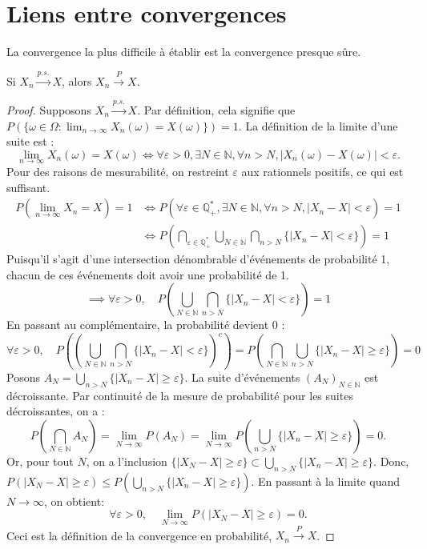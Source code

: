 \section{Liens entre convergences}
La convergence la plus difficile à établir est la convergence presque sûre.
\begin{proposition}
Si $X_n \xrightarrow{p.s.} X$, alors $X_n \xrightarrow{P} X$.
\end{proposition}
\begin{proof}
Supposons $X_n \xrightarrow{p.s.} X$. Par définition, cela signifie que $P(\{\omega \in \Omega : \lim_{n \to \infty} X_n(\omega) = X(\omega)\}) = 1$.
La définition de la limite d'une suite est :
\[
\lim_{n \to \infty} X_n(\omega) = X(\omega) \iff \forall \varepsilon > 0, \exists N \in \mathbb{N}, \forall n > N, |X_n(\omega) - X(\omega)| < \varepsilon.
\]
Pour des raisons de mesurabilité, on restreint $\varepsilon$ aux rationnels positifs, ce qui est suffisant.
\begin{align*}
    P(\lim_{n \to \infty} X_n = X) = 1 &\iff P\left(\forall \varepsilon \in \mathbb{Q}_+^*, \exists N \in \mathbb{N}, \forall n > N, |X_n - X| < \varepsilon\right) = 1 \\
    &\iff P\left(\bigcap_{\varepsilon \in \mathbb{Q}_+^*} \bigcup_{N \in \mathbb{N}} \bigcap_{n > N} \{|X_n - X| < \varepsilon\}\right) = 1
\end{align*}
Puisqu'il s'agit d'une intersection dénombrable d'événements de probabilité 1, chacun de ces événements doit avoir une probabilité de 1.
\[
\implies \forall \varepsilon > 0, \quad P\left(\bigcup_{N \in \mathbb{N}} \bigcap_{n > N} \{|X_n - X| < \varepsilon\}\right) = 1
\]
En passant au complémentaire, la probabilité devient 0 :
\[
\forall \varepsilon > 0, \quad P\left(\left(\bigcup_{N \in \mathbb{N}} \bigcap_{n > N} \{|X_n - X| < \varepsilon\}\right)^c\right) = P\left(\bigcap_{N \in \mathbb{N}} \bigcup_{n > N} \{|X_n - X| \geq \varepsilon\}\right) = 0
\]
Posons $A_N = \bigcup_{n > N} \{|X_n - X| \geq \varepsilon\}$. La suite d'événements $(A_N)_{N \in \mathbb{N}}$ est décroissante. Par continuité de la mesure de probabilité pour les suites décroissantes, on a :
\[
P\left(\bigcap_{N \in \mathbb{N}} A_N\right) = \lim_{N \to \infty} P(A_N) = \lim_{N \to \infty} P\left(\bigcup_{n > N} \{|X_n - X| \geq \varepsilon\}\right) = 0.
\]
Or, pour tout $N$, on a l'inclusion $\{|X_N - X| \geq \varepsilon\} \subset \bigcup_{n > N} \{|X_n - X| \geq \varepsilon\}$.
Donc, $P(|X_N - X| \geq \varepsilon) \leq P(\bigcup_{n > N} \{|X_n - X| \geq \varepsilon\})$. En passant à la limite quand $N \to \infty$, on obtient:
\[
\forall \varepsilon > 0, \quad \lim_{N \to \infty} P(|X_N - X| \geq \varepsilon) = 0.
\]
Ceci est la définition de la convergence en probabilité, $X_n \xrightarrow{P} X$.
\end{proof}
